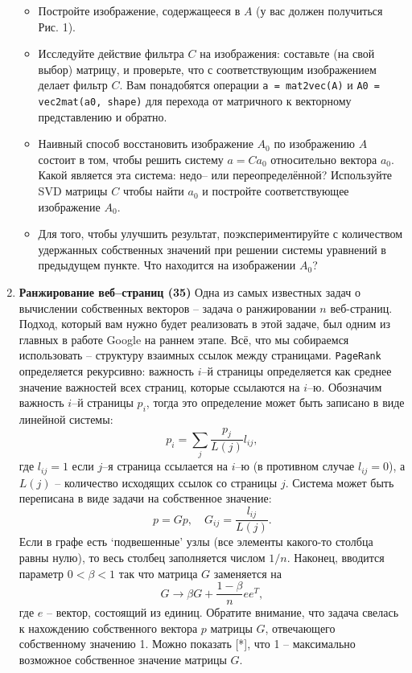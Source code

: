 \documentclass[prb,papersize=a4paper,notitlepage]{revtex4-1}%
\begin{document}
\begin{enumerate}
\begin{figure}[h!]
\label{subs}
\end{figure}
\begin{itemize}
\item Постройте изображение, содержащееся в $A$ (у вас должен получиться Рис. 1).
\item Исследуйте действие фильтра $C$ на изображения: составьте (на свой выбор) матрицу, и проверьте, что с соответствующим изображением делает фильтр $C$. Вам понадобятся операции \lstinline{a = mat2vec(A)} и \lstinline{A0 = vec2mat(a0, shape)} для перехода от матричного к векторному представлению и обратно.
\item Наивный способ восстановить изображение $A_0$ по изображению $A$ состоит в том, чтобы решить систему $a = C a_0$ относительно вектора $a_0$. Какой является эта система: недо-- или переопределённой? Используйте SVD матрицы $C$ чтобы найти $a_0$ и постройте соответствующее изображение $A_0$.
\item Для того, чтобы улучшить результат, поэкспериментируйте с количеством удержанных собственных значений при решении системы уравнений в предыдущем пункте. Что находится на изображении $A_0$?
\end{itemize}
\item \textbf{Ранжирование веб--страниц (35)} Одна из самых известных задач о вычислении собственных векторов -- задача о ранжировании $n$ веб-страниц. Подход, который вам нужно будет реализовать в этой задаче, был одним из главных в работе Google на раннем этапе. Всё, что мы собираемся использовать -- структуру взаимных ссылок между страницами. \lstinline{PageRank} определяется рекурсивно: важность $i$--й страницы определяется как среднее значение важностей всех страниц, которые ссылаются на $i$--ю. Обозначим важность $i$--й страницы $p_i$, тогда это определение может быть записано в виде линейной системы:
$$ p_i = \sum_{j} \frac{p_j}{L(j)}l_{ij}, $$
где $l_{ij}=1$ если $j$--я страница ссылается на $i$--ю (в противном случае $l_{ij}=0$), а $L(j)$ -- количество исходящих ссылок со страницы $j$. Система может быть переписана в виде задачи на собственное значение:
$$ p = G p, \quad G_{ij} = \frac{l_{ij}}{L(j)}.$$ Если в графе есть `подвешенные' узлы (все элементы какого-то столбца равны нулю), то весь столбец заполняется числом $1/n$. Наконец, вводится параметр $0<\beta<1$ так что матрица $G$ заменяется на
$$
G\to \beta G + \frac{1-\beta}{n} e e^T,
$$
где $e$ -- вектор, состоящий из единиц. Обратите внимание, что задача свелась к нахождению собственного вектора $p$ матрицы $G$, отвечающего собственному значению 1.  Можно показать [*], что  1 -- максимально возможное собственное значение матрицы $G$.


\end{enumerate}
\end{document}
